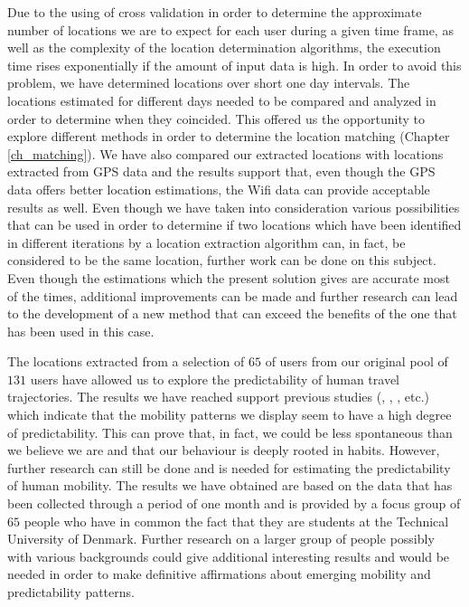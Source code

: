 Due to the using of cross validation in order to determine the approximate
number of locations we are to expect for each user during a given time frame, as well
as the complexity of the location determination algorithms, the execution time
rises exponentially if the amount of input data is high. In order to avoid this
problem, we have determined locations over short one day intervals. The
locations estimated for different days needed to be compared and analyzed in order to
determine when they coincided. This offered us the opportunity to explore
different methods in order to determine the location matching (Chapter
\ref{ch_matching}). We have also compared our extracted locations with locations
extracted from GPS data and the results support that, even though the GPS data
offers better location estimations, the Wifi data can provide acceptable results
as well. Even though we have taken into consideration various possibilities that
can be used in order to determine if two locations which have been identified in
different iterations by a location extraction algorithm can, in fact, be
considered to be the same location, further work can be done on this subject.
Even though the estimations which the present solution gives are accurate most
of the times, additional improvements can be made and further research can lead
to the development of a new method that can exceed the benefits of the one that
has been used in this case.

The locations extracted from a selection of $65$ of users from our original pool
of $131$ users have allowed us to explore the predictability of human travel
trajectories. The results we have reached support previous studies
(\cite{Barabasi10}, \cite{Barabasi08}, \cite{Sinatra14}, \cite{Brockmann06}
etc.) which indicate that the mobility patterns we display seem to have a high
degree of predictability. This can prove that, in fact, we could be less
spontaneous than we believe we are and that our behaviour is deeply rooted in
habits. However, further research can still be done and is needed for estimating
the predictability of human mobility. The results we have obtained are based on
the data that has been collected through a period of one month and is provided
by a focus group of $65$ people who have in common the fact that they are
students at the Technical University of Denmark. Further research on a larger
group of people possibly with various backgrounds could give additional
interesting results and would be needed in order to make definitive affirmations
about emerging mobility and predictability patterns.

